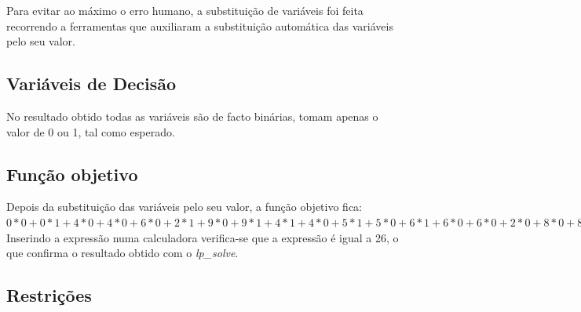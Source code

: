 Para evitar ao máximo o erro humano, a substituição de variáveis foi feita
recorrendo a ferramentas que auxiliaram a substituição automática das variáveis
pelo seu valor.

\subsection{Variáveis de Decisão}

No resultado obtido todas as variáveis são de facto binárias, tomam apenas
o valor de 0 ou 1, tal como esperado.

\subsection{Função objetivo}

Depois da substituição das variáveis pelo seu valor, a função objetivo
fica:\\[0.5cm]

$0*0+0*1+4*0+4*0+6*0+2*1+9*0+9*1+4*1+4*0+5*1
+5*0+6*1+6*0+6*0+2*0+8*0+8*0+8*0+7*0 = 26$\\[0.5cm]

Inserindo a expressão numa calculadora verifica-se que a expressão é igual a 26,
o que confirma o resultado obtido com o \textit{lp\_solve}.

\subsection{Restrições}

